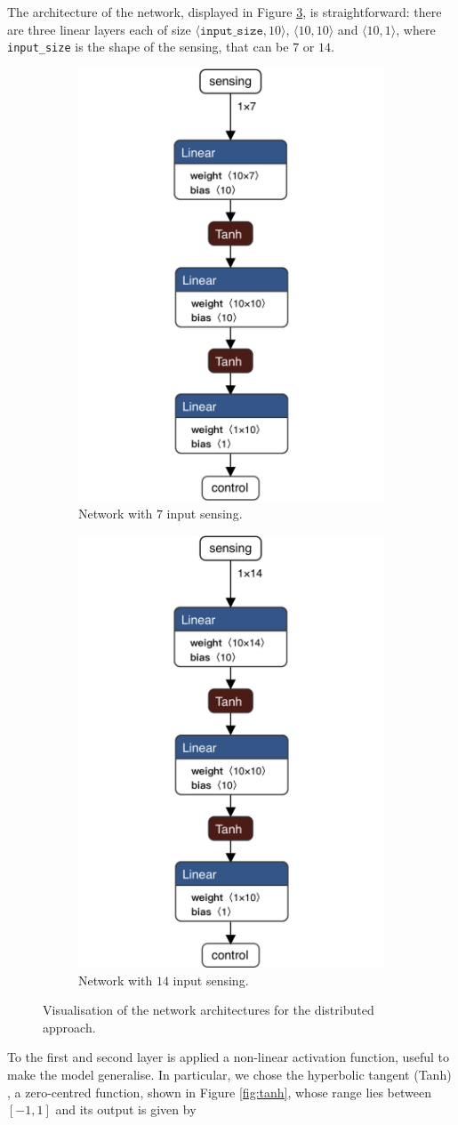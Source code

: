 The architecture of the network, displayed in Figure 
\ref{fig:singlenetdistributed1}, is straightforward: there are three linear 
layers each of size $\langle\mathtt{input\_size}, 10\rangle$,  $\langle 10, 
10\rangle$ and $\langle 10, 1\rangle$, where \texttt{input\_size} is the 
shape of the sensing, that can be $7$ or $14$.
\begin{figure}[htb]
	\centering
	\begin{subfigure}[h]{0.495\textwidth}
		\centering
		\includegraphics[width=.3\textwidth]{contents/images/task1distributed@4x}%
		\caption{Network with $7$ input sensing.}
		\label{fig:singlenet7distributed1}
	\end{subfigure}
	\hfill
	\begin{subfigure}[h]{0.495\textwidth}
		\centering
		\includegraphics[width=.3\textwidth]{contents/images/task1distributed_all@4x}
		\caption{Network with $14$ input sensing.}
		\label{fig:singlenet14distributed1}
	\end{subfigure}
	\caption[Network architectures for the distributed approach.]{Visualisation of 
	the network architectures for the distributed approach.}
	\label{fig:singlenetdistributed1}
\end{figure}
To the first and second layer is applied a non-linear activation function, 
useful to make the model generalise. 
In particular, we chose the hyperbolic tangent (Tanh) 
\cite[see][]{kalman1992tanh}, a zero-centred function, shown in Figure 
\ref{fig:tanh}, whose range lies between $[-1, 1]$ and its output is given by

